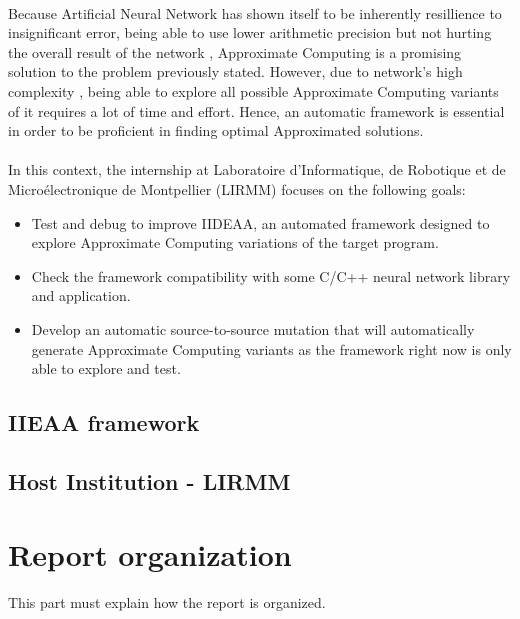~\\
Because Artificial Neural Network has shown itself to be inherently resillience to insignificant error, being able to use lower arithmetic precision but not hurting the overall result of the network \cite{DBLP:journals/corr/SungSH15}, Approximate Computing is a promising solution to the problem previously stated. However, due to network's high complexity , being able to explore all possible Approximate Computing variants of it requires a lot of time and effort. Hence, an automatic framework is essential in order to be proficient in finding optimal Approximated solutions. \\
~\\
In this context, the internship at Laboratoire d'Informatique, de Robotique et de Microélectronique de Montpellier (LIRMM) focuses on the following goals: ~\\
\begin{itemize}
	\item Test and debug to improve IIDEAA, an automated framework designed to explore Approximate Computing variations of the target program.
	\item Check the framework compatibility with some C/C++ neural network library and application.
	\item Develop an automatic source-to-source mutation that will automatically generate Approximate Computing variants as the framework right now is only able to explore and test. 
\end{itemize}
\vspace*{1cm}

\subsection{IIEAA framework}

\vspace*{1cm}

\subsection{Host Institution - LIRMM}

\vspace*{1cm}

\vspace*{1cm}


\section{Report organization}

This part must explain how the report is organized.
